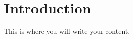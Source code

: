 \documentclass{article}
\title{Project #0}
\author{Paige Lorson}
\begin{document}
\maketitle{}
\section{Introduction}
This is where you will write your content.
\end{document}
